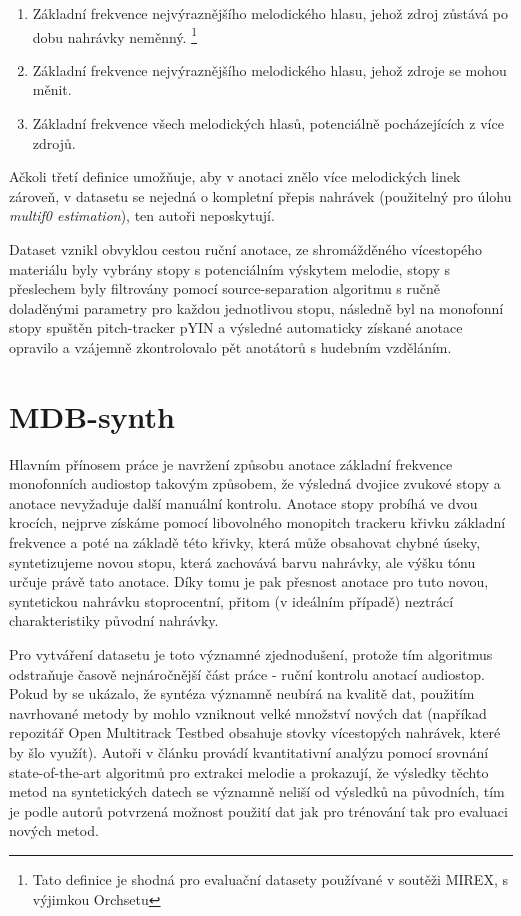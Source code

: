 \begin{enumerate}
    \item Základní frekvence nejvýraznějšího melodického hlasu, jehož zdroj zůstává po dobu nahrávky neměnný. \footnote{Tato definice je shodná pro evaluační datasety používané v soutěži MIREX, s výjimkou Orchsetu}
    \item Základní frekvence nejvýraznějšího melodického hlasu, jehož zdroje se mohou měnit.
    \item Základní frekvence všech melodických hlasů, potenciálně pocházejících z více zdrojů.
\end{enumerate}

Ačkoli třetí definice umožňuje, aby v anotaci znělo více melodických linek zároveň, v datasetu se nejedná o kompletní přepis nahrávek (použitelný pro úlohu \textit{multif0 estimation}), ten autoři neposkytují.

Dataset vznikl obvyklou cestou ruční anotace, ze shromážděného vícestopého materiálu byly vybrány stopy s potenciálním výskytem melodie, stopy s přeslechem byly filtrovány pomocí source-separation algoritmu s ručně doladěnými parametry pro každou jednotlivou stopu, následně byl na monofonní stopy spuštěn pitch-tracker pYIN a výsledné automaticky získané anotace opravilo a vzájemně zkontrolovalo pět anotátorů s hudebním vzděláním. 

\section{MDB-synth}\label{sec:mdb_synth}

Hlavním přínosem práce \cite{Salamon2017} je navržení způsobu anotace základní frekvence monofonních audiostop takovým způsobem, že výsledná dvojice zvukové stopy a anotace nevyžaduje další manuální kontrolu. Anotace stopy probíhá ve dvou krocích, nejprve získáme pomocí libovolného monopitch trackeru křivku základní frekvence a poté na základě této křivky, která může obsahovat chybné úseky, syntetizujeme novou stopu, která zachovává barvu nahrávky, ale výšku tónu určuje právě tato anotace. Díky tomu je pak přesnost anotace pro tuto novou, syntetickou nahrávku stoprocentní, přitom (v ideálním případě) neztrácí charakteristiky původní nahrávky.

Pro vytváření datasetu je toto významné zjednodušení, protože tím algoritmus odstraňuje časově nejnáročnější část práce - ruční kontrolu anotací audiostop. Pokud by se ukázalo, že syntéza významně neubírá na kvalitě dat, použitím navrhované metody by mohlo vzniknout velké množství nových dat (napříkad repozitář Open Multitrack Testbed obsahuje stovky vícestopých nahrávek, které by šlo využít). Autoři v článku provádí kvantitativní analýzu pomocí srovnání state-of-the-art algoritmů pro extrakci melodie a prokazují, že výsledky těchto metod na syntetických datech se významně neliší od výsledků na původních, tím je podle autorů potvrzená možnost použití dat jak pro trénování tak pro evaluaci nových metod.

